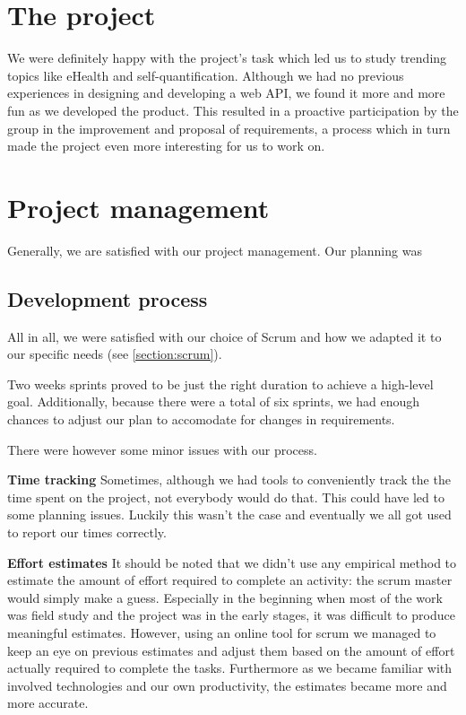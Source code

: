 \section{The project}
We were definitely happy with the project's task which led us to study trending topics
like eHealth and self-quantification. Although we had no previous experiences in designing and developing a web API,
we found it more and more fun as we developed the product. This resulted in a proactive participation by the group
in the improvement and proposal of requirements, a process which in turn made the project even more interesting
for us to work on.

\section{Project management}
Generally, we are satisfied with our project management.
Our planning was 


\subsection{Development process}
All in all, we were satisfied with our choice of Scrum and how we adapted
it to our specific needs (see \ref{section:scrum}).

Two weeks sprints proved to be just the right duration to achieve
a high-level goal. Additionally, because there were a total of six sprints,
we had enough chances to adjust our plan to accomodate for changes in requirements.

There were however some minor issues with our process.

\textbf{Time tracking}\newline
Sometimes, although we had tools to conveniently track the the time spent on the project,
not everybody would do that. This could have led to some planning issues.
Luckily this wasn't the case and eventually we all got used to report our times correctly.

\textbf{Effort estimates}\newline
It should be noted that we didn't use any empirical method to estimate the amount of effort
required to complete an activity: the scrum master would simply make a guess.
Especially in the beginning when most of the work was field study and the project
was in the early stages, it was difficult to produce meaningful estimates.
However, using an online tool for scrum we managed to keep an eye on previous
estimates and adjust them based on the amount of effort actually required to complete the tasks.
Furthermore as we became familiar with involved technologies and our own productivity,
the estimates became more and more accurate.

